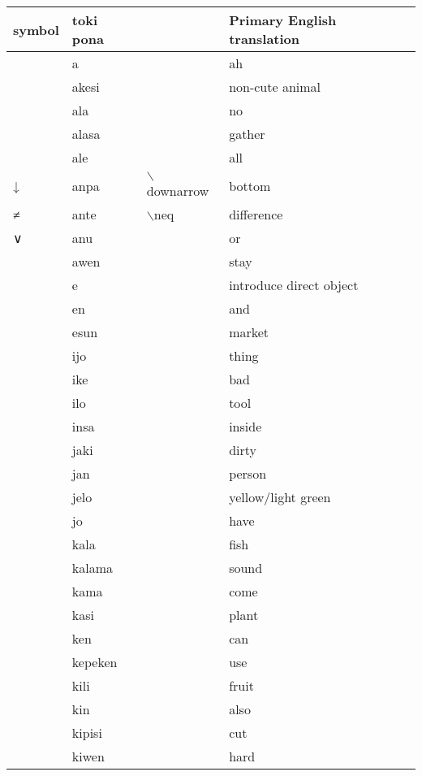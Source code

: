 
\begin{table}
    \centering
    \begin{tabular}{|l|l|l|l|}
    \hline
        symbol & toki pona &  & Primary English translation \\ \hline
         & a &  & ah \\ \hline
         & akesi &  & non-cute animal \\ \hline
         & ala &  & no \\ \hline
         & alasa &  & gather \\ \hline
         & ale &  & all \\ \hline
        ↓ & anpa & $\backslash$downarrow & bottom \\ \hline
        ≠ & ante & $\backslash$neq & difference \\ \hline
        ∨ & anu &  & or \\ \hline
         & awen &  & stay \\ \hline
         & e &  & introduce direct object \\ \hline
         & en &  & and \\ \hline
         & esun &  & market \\ \hline
         & ijo &  & thing \\ \hline
         & ike &  & bad \\ \hline
         & ilo &  & tool \\ \hline
         & insa &  & inside \\ \hline
         & jaki &  & dirty \\ \hline
         & jan &  & person \\ \hline
         & jelo &  & yellow/light green \\ \hline
         & jo &  & have \\ \hline
         & kala &  & fish \\ \hline
         & kalama &  & sound \\ \hline
         & kama &  & come \\ \hline
         & kasi &  & plant \\ \hline
         & ken &  & can \\ \hline
         & kepeken &  & use \\ \hline
         & kili &  & fruit \\ \hline
         & kin &  & also \\ \hline
        ️ & kipisi &  & cut \\ \hline
         & kiwen &  & hard \\ \hline

\end{tabular}
\end{table}
